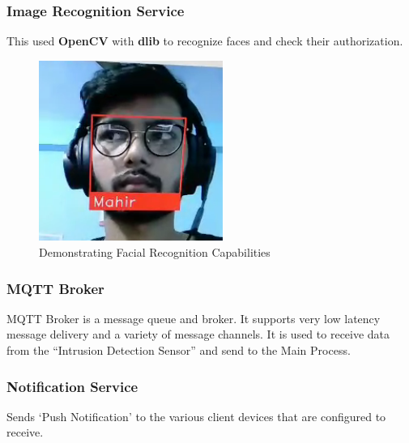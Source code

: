         \subsubsection{Image Recognition Service}
        \begin{flushleft}
            This used \textbf{OpenCV} with \textbf{dlib} to recognize faces and check their authorization.
        \end{flushleft}
        \begin{figure}[H]
            \centering
            \includegraphics[width=6cm]{images/facerec.png}
            \caption{Demonstrating Facial Recognition Capabilities}
        \end{figure}

        \subsubsection{MQTT Broker}
        \begin{flushleft}
            MQTT Broker is a message queue and broker. It supports very low latency message delivery and a variety of message channels.
            It is used to receive data from the ``Intrusion Detection Sensor'' and send to the Main Process.
        \end{flushleft}

        \subsubsection{Notification Service}
        \begin{flushleft}
            Sends `Push Notification' to the various client devices that are configured to receive. 
        \end{flushleft}


